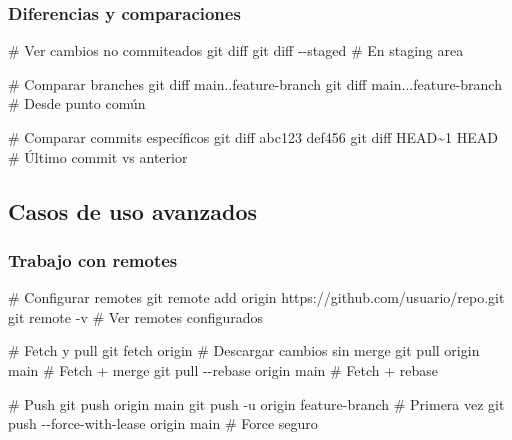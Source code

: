 \documentclass[
  11pt,
  letterpaper,
  oneside,
  openany]{scrbook}
\newenvironment{Shaded}{}{}
\newcommand{\AttributeTok}[1]{\textcolor[rgb]{0.84,0.23,0.29}{#1}}
\newcommand{\CommentTok}[1]{\textcolor[rgb]{0.42,0.45,0.49}{#1}}
\newcommand{\FunctionTok}[1]{\textcolor[rgb]{0.44,0.26,0.76}{#1}}
\newcommand{\NormalTok}[1]{\textcolor[rgb]{0.14,0.16,0.18}{#1}}
\begin{document}
\subsubsection{Diferencias y
comparaciones}\label{diferencias-y-comparaciones}

\begin{Shaded}
\begin{Highlighting}[]
\CommentTok{\# Ver cambios no commiteados}
\FunctionTok{git}\NormalTok{ diff}
\FunctionTok{git}\NormalTok{ diff }\AttributeTok{{-}{-}staged}  \CommentTok{\# En staging area}

\CommentTok{\# Comparar branches}
\FunctionTok{git}\NormalTok{ diff main..feature{-}branch}
\FunctionTok{git}\NormalTok{ diff main...feature{-}branch  }\CommentTok{\# Desde punto común}

\CommentTok{\# Comparar commits específicos}
\FunctionTok{git}\NormalTok{ diff abc123 def456}
\FunctionTok{git}\NormalTok{ diff HEAD\textasciitilde{}1 HEAD  }\CommentTok{\# Último commit vs anterior}
\end{Highlighting}
\end{Shaded}

\subsection{Casos de uso avanzados}\label{casos-de-uso-avanzados-5}

\subsubsection{Trabajo con remotes}\label{trabajo-con-remotes}

\begin{Shaded}
\begin{Highlighting}[]
\CommentTok{\# Configurar remotes}
\FunctionTok{git}\NormalTok{ remote add origin https://github.com/usuario/repo.git}
\FunctionTok{git}\NormalTok{ remote }\AttributeTok{{-}v}  \CommentTok{\# Ver remotes configurados}

\CommentTok{\# Fetch y pull}
\FunctionTok{git}\NormalTok{ fetch origin  }\CommentTok{\# Descargar cambios sin merge}
\FunctionTok{git}\NormalTok{ pull origin main  }\CommentTok{\# Fetch + merge}
\FunctionTok{git}\NormalTok{ pull }\AttributeTok{{-}{-}rebase}\NormalTok{ origin main  }\CommentTok{\# Fetch + rebase}

\CommentTok{\# Push}
\FunctionTok{git}\NormalTok{ push origin main}
\FunctionTok{git}\NormalTok{ push }\AttributeTok{{-}u}\NormalTok{ origin feature{-}branch  }\CommentTok{\# Primera vez}
\FunctionTok{git}\NormalTok{ push }\AttributeTok{{-}{-}force{-}with{-}lease}\NormalTok{ origin main  }\CommentTok{\# Force seguro}
\end{Highlighting}
\end{Shaded}
\end{document}

